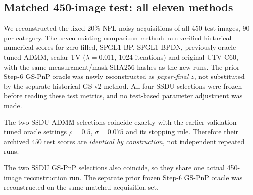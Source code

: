 \documentclass[a4paper,10pt]{article}
\begin{document}
\subsection*{Matched 450-image test: all eleven methods}
We reconstructed the fixed 20\% NPL-noisy acquisitions of all 450 test images, 90 per category.
The seven existing comparison methods use verified historical numerical scores for
zero-filled, SPGL1-BP, SPGL1-BPDN, previously oracle-tuned ADMM, scalar TV
($\lambda=0.011$, 1024 iterations) and original UTV-C60, with the same
measurement/mask SHA256 hashes as the new runs. The prior Step-6 GS-PnP
oracle was newly reconstructed as \emph{paper-final $z$}, not substituted by
the separate historical GS-v2 method. All four SSDU selections were frozen
before reading these test metrics, and no test-based parameter adjustment was made.

The two SSDU ADMM selections coincide exactly with the earlier validation-tuned oracle settings $\rho=0.5$, $\sigma=0.075$ and its stopping rule. Therefore their archived 450 test scores are \emph{identical by construction}, not independent repeated runs.

The two SSDU GS-PnP selections also coincide, so they share one actual 450-image reconstruction run. The separate prior frozen Step-6 GS-PnP oracle was reconstructed on the same matched acquisition set.
\end{document}
